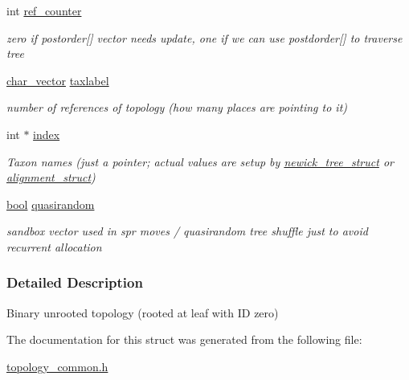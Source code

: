\begin{DoxyCompactItemize}
int \hyperlink{structtopology__struct_af34229c1a7f6312c4ca98c05b12aacc2}{ref\+\_\+counter}
\begin{DoxyCompactList}\small\item\em zero if postorder\mbox{[}\mbox{]} vector needs update, one if we can use postdorder\mbox{[}\mbox{]} to traverse tree \end{DoxyCompactList}\item 
\mbox{\label{structtopology__struct_a5b607230aba25816247ff1a6de879364}} 
\hyperlink{structchar__vector__struct}{char\+\_\+vector} \hyperlink{structtopology__struct_a5b607230aba25816247ff1a6de879364}{taxlabel}
\begin{DoxyCompactList}\small\item\em number of references of topology (how many places are pointing to it) \end{DoxyCompactList}\item 
\mbox{\label{structtopology__struct_aaa2d082ac0e89064cfef0295cad42192}} 
int $\ast$ \hyperlink{structtopology__struct_aaa2d082ac0e89064cfef0295cad42192}{index}
\begin{DoxyCompactList}\small\item\em Taxon names (just a pointer; actual values are setup by \hyperlink{structnewick__tree__struct}{newick\+\_\+tree\+\_\+struct} or \hyperlink{structalignment__struct}{alignment\+\_\+struct}) \end{DoxyCompactList}\item 
\mbox{\label{structtopology__struct_a9ef01e28228f17731ab9fdb9ea98cb4f}} 
\hyperlink{lowlevel_8h_a97a80ca1602ebf2303258971a2c938e2}{bool} \hyperlink{structtopology__struct_a9ef01e28228f17731ab9fdb9ea98cb4f}{quasirandom}
\begin{DoxyCompactList}\small\item\em sandbox vector used in spr moves / quasirandom tree shuffle just to avoid recurrent allocation \end{DoxyCompactList}\end{DoxyCompactItemize}


\subsubsection{Detailed Description}
Binary unrooted topology (rooted at leaf with ID zero) 

The documentation for this struct was generated from the following file\+:\begin{DoxyCompactItemize}
\item 
\hyperlink{topology__common_8h}{topology\+\_\+common.\+h}\end{DoxyCompactItemize}
